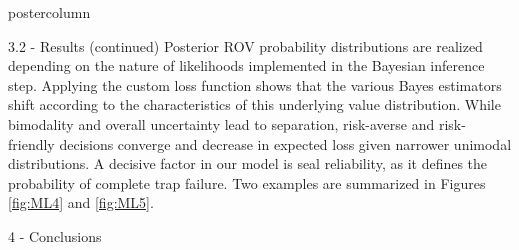 \documentclass{beamer}
\begin{document}
\begin{frame}
\begin{columns}
\begin{column}{.249\textwidth}
\begin{beamercolorbox}[center]{postercolumn}
\begin{minipage}{.98\textwidth}
{\begin{myblock}{3.2 - Results (continued)}
Posterior ROV probability distributions are realized depending on the nature of likelihoods implemented in the Bayesian inference step. Applying the custom loss function shows that the various Bayes estimators shift according to the characteristics of this underlying	value distribution. While bimodality and overall uncertainty lead to separation, risk-averse and risk-friendly decisions converge and decrease in expected loss given narrower unimodal distributions. A decisive factor in our model is seal reliability, as it defines the probability of complete trap failure. Two examples are summarized in Figures \ref{fig:ML4} and \ref{fig:ML5}.
\end{myblock}
		
\begin{myblock}{4 - Conclusions}


\end{myblock}}
\end{minipage}
\end{beamercolorbox}
\end{column}
\end{columns}
\end{frame}
\end{document}
